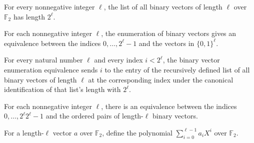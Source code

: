 \begin{theorem}
\label{FABL.length_allBinaryVectors}
\leanok
{}
For every nonnegative integer $\ell$, the list of all binary vectors of length $\ell$
over $\mathbb F_2$ has length $2^\ell$.
\end{theorem}

\begin{definition}
\label{FABL.binaryVectorEnumerationEquiv}
\leanok
{}
For each nonnegative integer $\ell$, the enumeration of binary vectors gives an
equivalence between the indices $0,\ldots,2^\ell-1$ and the vectors in $\{0,1\}^\ell$.
\end{definition}

\begin{theorem}
\label{FABL.binaryVectorEnumerationEquiv_apply}
\leanok
{}
For every natural number $\ell$ and every index $i<2^\ell$, the binary vector
enumeration equivalence sends $i$ to the entry of the recursively defined list of all
binary vectors of length $\ell$ at the corresponding index under the canonical
identification of that list's length with $2^\ell$.
\end{theorem}

\begin{definition}
\label{FABL.binaryVectorPairEnumerationEquiv}
\leanok
{}
For each nonnegative integer $\ell$, there is an equivalence between the indices
$0,\ldots,2^\ell 2^\ell-1$ and the ordered pairs of length-$\ell$ binary vectors.
\end{definition}

\begin{definition}
\label{FABL.binaryLowPolynomial}
\leanok
{}
For a length-$\ell$ vector $a$ over $\mathbb{F}_2$, define the polynomial
$\sum_{i=0}^{\ell-1} a_i X^i$ over $\mathbb{F}_2$.
\end{definition}

